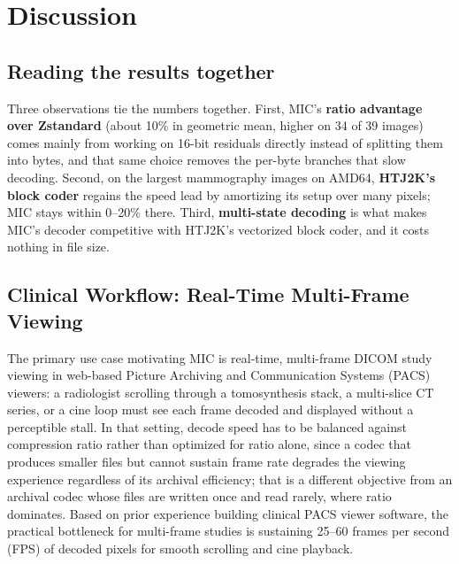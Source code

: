 \documentclass[journal]{IEEEtran}
\begin{document}
\section{Discussion}
\label{sec:discussion}

\subsection{Reading the results together}

Three observations tie the numbers together. First, MIC's \textbf{ratio
advantage over Zstandard} (about 10\% in geometric mean, higher on 34 of 39
images) comes mainly from working on 16-bit residuals directly instead of
splitting them into bytes, and that same choice removes the per-byte branches
that slow decoding. Second, on the largest mammography images on AMD64,
\textbf{HTJ2K's block coder} regains the speed lead by amortizing its setup
over many pixels; MIC stays within 0--20\% there.
Third, \textbf{multi-state decoding} is what makes MIC's decoder competitive
with HTJ2K's vectorized block coder, and it costs nothing in file size.

\subsection{Clinical Workflow: Real-Time Multi-Frame Viewing}
\label{sec:clinical-workflow}

The primary use case motivating MIC is real-time, multi-frame DICOM study
viewing in web-based Picture Archiving and Communication Systems (PACS)
viewers: a radiologist scrolling through a tomosynthesis stack, a multi-slice
CT series, or a cine loop must see each frame decoded and displayed without a
perceptible stall. In that setting, decode speed has to be balanced against
compression ratio rather than optimized for ratio alone, since a codec that
produces smaller files but cannot sustain frame rate degrades the viewing
experience regardless of its archival efficiency; that is a different
objective from an archival codec whose files are written once and read
rarely, where ratio dominates. Based on prior experience building clinical
PACS viewer software, the practical bottleneck for multi-frame studies is
sustaining 25--60 frames per second (FPS) of decoded pixels for smooth
scrolling and cine playback.
\end{document}
